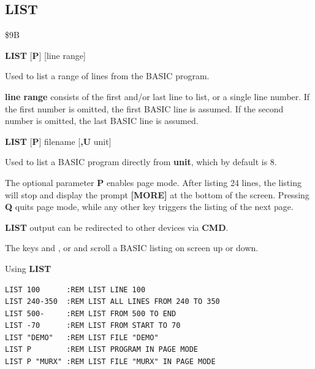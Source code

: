 \subsection{LIST}
\begin{description}[leftmargin=2cm,style=nextline]
\item [Token:] \$9B
\item [Format:] {\bf LIST} [{\bf P}] [line range]

\item [Usage:] Used to list a range of lines from the BASIC program.

               {\bf line range} consists of the first and/or last
               line to list, or a single line number.
               If the first number is omitted, the
               first BASIC line is assumed.
               If the second number is omitted, the last BASIC line
               is assumed.

\item [Format:] {\bf LIST} [{\bf P}] filename [{\bf,U} unit]

\item [Usage:] Used to list a BASIC program directly from {\bf unit},
               which by default is 8.

\item [Remarks:]

                The optional parameter {\bf P} enables page mode.
                After listing 24 lines, the listing will stop and display
                the prompt {\bf [MORE]} at the bottom of the screen.
                Pressing {\bf Q} quits page mode, while any other key
                triggers the listing of the next page.

                {\bf LIST} output can be redirected
                to other devices via {\bf CMD}.

                The keys  and , or
                   and
                  
                scroll a BASIC listing on screen up or down.

\item [Examples:] Using {\bf LIST}
\begin{tcolorbox}[colback=black,coltext=white]
\verbatimfont{\codefont}
\begin{verbatim}
LIST 100      :REM LIST LINE 100
LIST 240-350  :REM LIST ALL LINES FROM 240 TO 350
LIST 500-     :REM LIST FROM 500 TO END
LIST -70      :REM LIST FROM START TO 70
LIST "DEMO"   :REM LIST FILE "DEMO"
LIST P        :REM LIST PROGRAM IN PAGE MODE
LIST P "MURX" :REM LIST FILE "MURX" IN PAGE MODE
\end{verbatim}
\end{tcolorbox}
\end{description}

